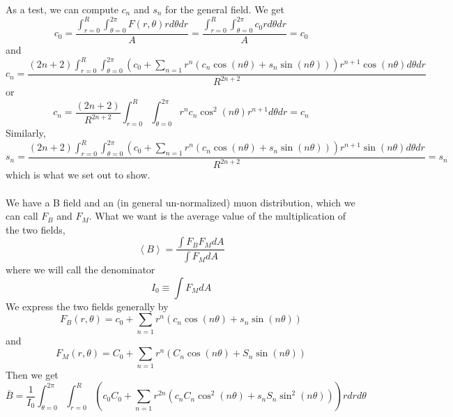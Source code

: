 \documentclass[twoside]{article}
\begin{document}
As a test, we can compute $c_n$ and $s_n$ for the general field. We get
\begin{equation}
c_0 = \frac{\int^{R}_{r = 0} \int^{2\pi}_{\theta = 0} F(r,\theta) r d\theta dr}{A} = 
\frac{\int^{R}_{r = 0} \int^{2\pi}_{\theta = 0} c_0 r d\theta dr}{A} = 
c_0
\end{equation}
and
\begin{equation}
c_n =
\frac{(2n + 2)\int^{R}_{r = 0}  \int^{2\pi}_{\theta = 0} 
(c_0 +  \sum_{n=1} r^{n} (c_{n} \cos(n \theta)  + s_{n} \sin(n \theta )   )) r^{n+1} \cos(n\theta) d\theta dr}{R^{2n+2}} 
\end{equation}
or
\begin{equation}
c_n =
\frac{(2n + 2)}{R^{2n+2}} 
\int^{R}_{r = 0}  \int^{2\pi}_{\theta = 0} 
r^{n} c_{n} \cos^2(n \theta)  r^{n+1} d\theta dr = c_n
\end{equation}
Similarly, 
\begin{equation}
s_n =
\frac{(2n + 2)\int^{R}_{r = 0}  \int^{2\pi}_{\theta = 0} 
	(c_0 +  \sum_{n=1} r^{n} (c_{n} \cos(n \theta)  + s_{n} \sin(n \theta )   )) r^{n+1} \sin(n\theta) d\theta dr}{R^{2n+2}}  = s_n
\end{equation}
which is what we set out to show. \\
\\
We have a B field and an (in general  un-normalized) muon distribution, which we can call $F_B$ and $F_M$. What we want is the average value of the multiplication of the two fields, 
\begin{equation}
\left\langle B \right\rangle = \frac{\int F_B F_M dA}{\int F_M dA}
\end{equation}
where we will call the denominator
\begin{equation}
\boxed{
I_0 \equiv \int F_M dA
}
\end{equation}
We express the two fields generally by
\begin{equation}
F_B(r,\theta) =   c_0 +  \sum_{n=1} r^{n} (c_{n} \cos(n \theta)  + s_{n} \sin(n \theta )   )
\end{equation}
and
\begin{equation}
F_M(r,\theta) =   C_0 +  \sum_{n=1} r^{n} (C_{n} \cos(n \theta)  + S_{n} \sin(n \theta )   )
\end{equation}
Then we get 
\begin{equation}
\bar{B} = \frac{1}{I_0}\int^{2\pi}_{\theta=0} \int^R_{r=0} (c_0C_0 + \sum_{n=1}r^{2n}(c_nC_n\cos^2(n \theta) + s_nS_n\sin^2(n \theta) )   )  r dr d\theta
\end{equation}
\end{document}
